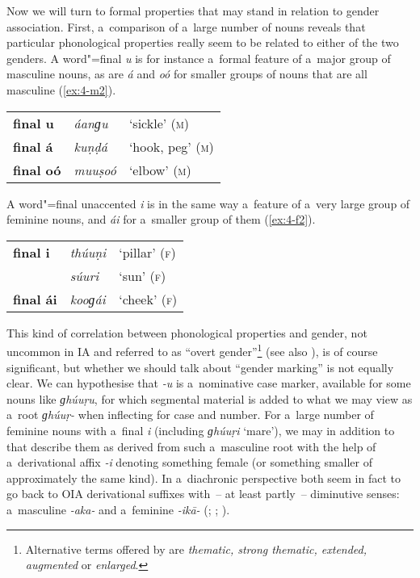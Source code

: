 Now we will turn to formal properties that may stand in relation to gender association. First, a~comparison of a~large number of nouns reveals that particular phonological properties really seem to be related to either of the two genders. A word"=final \textit{u} is for instance a~formal feature of a~major group of masculine nouns, as are \textit{á} and \textit{oó} for smaller groups of nouns that are all masculine (\ref{ex:4-m2}).


\begin{exe}
\extab
\label{ex:4-m2}
\begin{tabularx}{\textwidth}{ l l l }
\textbf{final u} &
\textit{áanɡu} &
`sickle' (\textsc{m})\\
\textbf{final á} &
\textit{kuṇḍá} &
`hook, peg' (\textsc{m})\\
\textbf{final oó} &
\textit{muuṣoó} &
`elbow' (\textsc{m})\\
\end{tabularx}
\end{exe}

A word"=final unaccented \textit{i} is in the same way a~feature of a~very large group of feminine nouns, and \textit{ái} for a~smaller group of them (\ref{ex:4-f2}).


\begin{exe}
\extab
\label{ex:4-f2}
\begin{tabularx}{\textwidth}{ l l l }
\textbf{final i} &
\textit{thúuṇi} &
`pillar' (\textsc{f})\\
&
\textit{súuri} &
`sun' (\textsc{f})\\
\textbf{final ái} &
\textit{kooɡái} &
`cheek' (\textsc{f})\\
\end{tabularx}
\end{exe}

This kind of correlation between phonological properties and gender, not uncommon in IA \citep[219]{masica1991} and referred to as ``overt gender''\footnote{Alternative terms offered by \citet[219]{masica1991} are \textit{thematic, strong thematic, extended, augmented} or \textit{enlarged}.} (see also \citealt[44, 62]{corbett1991}), is of course significant, but whether we should talk about ``gender marking'' is not equally clear. We can hypothesise that \textit{-u} is a~nominative case marker, available for some nouns like \textit{ɡhúuṛu}, for which segmental material is added to what we may view as a~root \textit{ɡhúuṛ-} when inflecting for case and number. For a~large number of feminine nouns with a~final \textit{i} (including \textit{ɡhúuṛi} `mare'), we may in addition to that describe them as derived from such a~masculine root with the help of a~derivational affix \textit{-i} denoting something female (or something smaller of approximately the same kind). In a~diachronic perspective both seem in fact to go back to OIA derivational suffixes with~-- at least partly~-- diminutive senses: a~masculine \textit{-aka-} and a~feminine \textit{-ikā-} (\citealt[222]{masica1991}; \citealt[15]{morgenstierne1941}; \citealt[29]{buddruss1967}).


